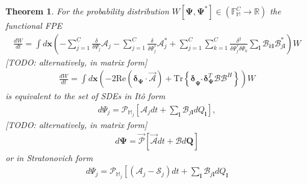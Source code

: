 \documentclass[12pt,aip,jmp,amssymb,amsmath]{revtex4-1}
\newtheorem{theorem}{Theorem}
\begin{document}
\begin{theorem}
\label{thm:app-fpe:fpe-sde-func}
    For the probability distribution $W[\boldsymbol{\Psi}, \boldsymbol{\Psi}^*] \in (\mathbb{F}_{\mathbb{M}}^C \rightarrow \mathbb{R})$ the functional FPE
    \begin{equation*}\begin{split}
        \frac{dW}{dt}
        = \int d\boldsymbol{x} \left(
            - \sum_{j=1}^C \frac{\delta}{\delta \Psi_j} \mathcal{A}_j
            - \sum_{j=1}^C \frac{\delta}{\delta \Psi_j^*} \mathcal{A}_j^*
            + \sum_{j=1}^C \sum_{k=1}^C \frac{\delta^2}{\delta \Psi_j^* \delta \Psi_k}
                \sum_{\boldsymbol{l}} \mathcal{B}_{k \boldsymbol{l}} \mathcal{B}_{j \boldsymbol{l}}^*
        \right) W
    \end{split}\end{equation*}
    [TODO: alternatively, in matrix form]
    \begin{equation*}\begin{split}
        \frac{dW}{dt}
        = \int d\boldsymbol{x} \left(
            - 2 \mathrm{Re} \left( \boldsymbol{\delta}_{\boldsymbol{\Psi}} \cdot \vec{\mathcal{A}} \right)
            + \mathrm{Tr} \left\{ \boldsymbol{\delta}_{\boldsymbol{\Psi}^*} \boldsymbol{\delta}_{\boldsymbol{\Psi}}^T \mathcal{B} \mathcal{B}^H \right\}
        \right) W
    \end{split}\end{equation*}
    is equivalent to the set of SDEs in It\^{o} form
    \begin{equation*}\begin{split}
        d\Psi_j = \mathcal{P}_{\mathbb{M}_j} \left[
            \mathcal{A}_j dt + \sum_{\boldsymbol{l}} \mathcal{B}_{j \boldsymbol{l}} dQ_{\boldsymbol{l}}
        \right],
    \end{split}\end{equation*}
    [TODO: alternatively, in matrix form]
    \begin{equation*}\begin{split}
        d\boldsymbol{\Psi} = \vec{\mathcal{P}} \left[
            \vec{\mathcal{A}} dt + \mathcal{B} d\boldsymbol{Q}
        \right]
    \end{split}\end{equation*}
    or in Stratonovich form
    \begin{equation*}\begin{split}
        d\Psi_j = \mathcal{P}_{\mathbb{M}_j} \left[
            (\mathcal{A}_j - \mathcal{S}_j) dt + \sum_{\boldsymbol{l}} \mathcal{B}_{j \boldsymbol{l}} dQ_{\boldsymbol{l}}

\end{split}
\end{equation*}
\end{theorem}
\end{document}
